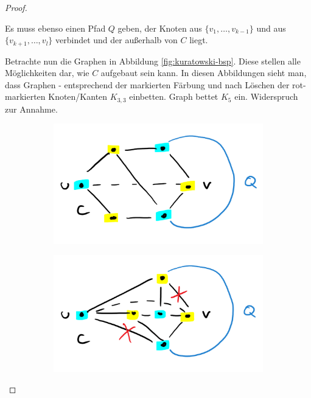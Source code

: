 \begin{proof}
\begin{description}
        Es muss ebenso einen Pfad $ Q $ geben, der Knoten aus $ \{ v_1, \dots, v_{k - 1} \} $ und aus $ \{ v_{k + 1}, \dots, v_l \} $ verbindet und der außerhalb von $ C $ liegt.

        Betrachte nun die Graphen in Abbildung \ref{fig:kuratowski-bsp}.
        Diese stellen alle Möglichkeiten dar, wie $ C $ aufgebaut sein kann.
        In diesen Abbildungen sieht man, dass Graphen - entsprechend der markierten Färbung und nach Löschen der rot-markierten Knoten/Kanten $ K_{3,3} $ einbetten.
        Graph  bettet $ K_5 $ ein.
        Widerspruch zur Annahme.
    \end{description}

    \begin{figure}
        \centering
        \def\w{0.45\textwidth}
        \begin{subfigure}[c]{\w}
            \centering
            \includegraphics[width=\textwidth]{figures/kuratowski1.png}
            \label{fig:kuratowski-bsp1}
        \end{subfigure}
        \begin{subfigure}[c]{\w}
            \centering
            \includegraphics[width=\textwidth]{figures/kuratowski2.png}

\end{subfigure}
\end{figure}
\end{proof}
